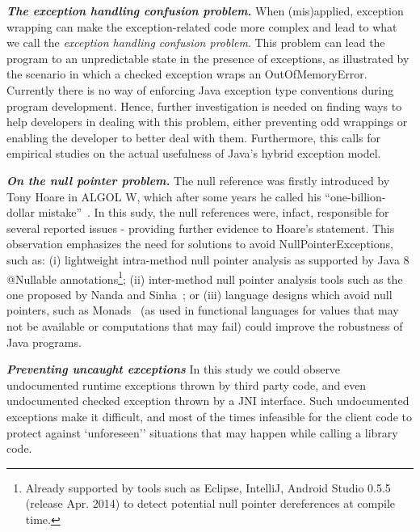 \emph{\textbf{The exception handling confusion problem.}}
When (mis)applied, exception wrapping can make the exception-related code
 more complex and lead to what we call the \emph{exception handling confusion problem}.
This problem can lead the program to an unpredictable state in the presence of exceptions,
as illustrated by the scenario in which a checked exception wraps an OutOfMemoryError. 
Currently there is no way of enforcing Java exception type conventions during program development.
Hence, further investigation is needed on finding ways to help developers in dealing with this
 problem, either preventing odd wrappings or enabling the developer to
 better deal with them.
Furthermore, this calls for empirical studies on the actual usefulness of Java's hybrid exception model. 


\emph{\textbf{On the null pointer problem.}}
The null reference was firstly introduced by Tony Hoare in ALGOL W, which after some years he called his ``one-billion-dollar mistake''~\cite{hoare2}.
In this sudy, the null references were, infact, responsible for several reported issues - providing further evidence to Hoare's statement.
This observation emphasizes the need for solutions to avoid NullPointerExceptions, such as:
(i) lightweight intra-method null pointer analysis as supported by
Java 8 @Nullable annotations\footnote{Already supported by tools such as Eclipse, IntelliJ, Android Studio 0.5.5 (release Apr. 2014) to detect potential 
null pointer dereferences at compile time.};
(ii) inter-method null pointer analysis tools such as the one proposed by Nanda and Sinha~\cite{nanda2009accurate};
or (iii) language designs which avoid null pointers, such 
as Monads~\cite{Walde95} (as used in functional languages for values that may not be available 
or computations that may fail) could improve the robustness of Java programs. 

\emph{\textbf{Preventing uncaught exceptions}}
In this study we could observe undocumented runtime exceptions thrown by third party code,
and even undocumented checked exception thrown by a JNI interface.
Such undocumented exceptions make it difficult, and most of the times infeasible
for the client code to protect against `unforeseen'' situations that may happen 
while calling a library code. 

